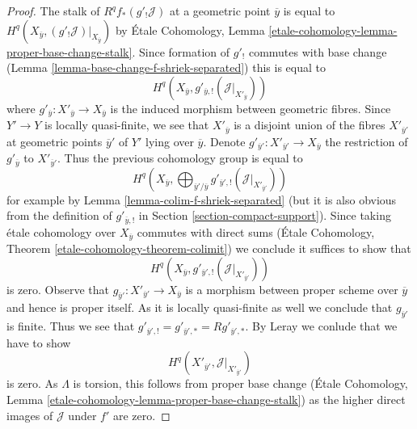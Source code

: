 \begin{proof}
\medskip\noindent
The stalk of $R^qf_*(g'_!\mathcal{J})$ at a geometric point
$\overline{y}$ is equal to
$H^q(X_{\overline{y}}, (g'_!\mathcal{J})|_{X_{\overline{y}}})$ by
\'Etale Cohomology, Lemma
\ref{etale-cohomology-lemma-proper-base-change-stalk}.
Since formation of $g'_!$ commutes with base change
(Lemma \ref{lemma-base-change-f-shriek-separated})
this is equal to
$$
H^q(X_{\overline{y}}, g'_{\overline{y}, !}(\mathcal{J}|_{X'_{\overline{y}}}))
$$
where $g'_{\overline{y}} : X'_{\overline{y}} \to X_{\overline{y}}$
is the induced morphism between geometric fibres.
Since $Y' \to Y$ is locally quasi-finite, we see that
$X'_{\overline{y}}$ is a disjoint union of the fibres
$X'_{\overline{y}'}$ at geometric points $\overline{y}'$ of $Y'$
lying over $\overline{y}$. Denote
$g'_{\overline{y}'} : X'_{\overline{y}'} \to X_{\overline{y}}$
the restriction of $g'_{\overline{y}}$ to $X'_{\overline{y}'}$.
Thus the previous cohomology group is equal to
$$
H^q(X_{\overline{y}},
\bigoplus\nolimits_{\overline{y}'/\overline{y}}
g'_{\overline{y}', !}(\mathcal{J}|_{X'_{\overline{y}'}}))
$$
for example by Lemma \ref{lemma-colim-f-shriek-separated} (but it
is also obvious from the definition of $g'_{\overline{y}, !}$
in Section \ref{section-compact-support}).
Since taking \'etale cohomology over $X_{\overline{y}}$
commutes with direct sums
(\'Etale Cohomology, Theorem \ref{etale-cohomology-theorem-colimit})
we conclude it suffices to show that
$$
H^q(X_{\overline{y}}, g'_{\overline{y}', !}(\mathcal{J}|_{X'_{\overline{y}'}}))
$$
is zero. Observe that
$g_{\overline{y}'} : X'_{\overline{y}'} \to X_{\overline{y}}$
is a morphism between proper scheme over $\overline{y}$ and hence is
proper itself. As it is locally quasi-finite as well we conclude that
$g_{\overline{y}'}$ is finite. Thus we see that
$g'_{\overline{y}', !} = g'_{\overline{y}', *} = Rg'_{\overline{y}', *}$.
By Leray we conlude that we have to show
$$
H^q(X'_{\overline{y}'}, \mathcal{J}|_{X'_{\overline{y}'}})
$$
is zero. As $\Lambda$ is torsion, this follows from proper base change
(\'Etale Cohomology, Lemma
\ref{etale-cohomology-lemma-proper-base-change-stalk})
as the higher direct images of $\mathcal{J}$ under $f'$ are zero.


\end{proof}
